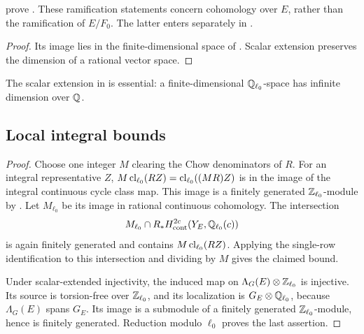  prove
. These ramification statements concern
cohomology over \(E\), rather than the ramification of
\(E/F_0\). The latter enters separately in
.


\begin{proof}
Its image lies in the finite-dimensional space of
. Scalar extension preserves the dimension of
a rational vector space.
\end{proof}

The scalar extension in  is
essential: a finite-dimensional \(\mathbb Q_{\ell_0}\)-space has
infinite dimension over \(\mathbb Q\).

\subsection{Local integral bounds}\label{sec:local-integral}


\begin{proof}
Choose one integer \(M\) clearing the Chow denominators of \(R\).
For an integral representative \(Z\),
\(M\operatorname{cl}_{\ell_0}(RZ)=\operatorname{cl}_{\ell_0}((MR)Z)\) is in the image of
the integral continuous cycle class map. This image is a finitely
generated \(\mathbb Z_{\ell_0}\)-module by
\cite[Theorem~2.4]{Kahn}. Let \(M_{\ell_0}\) be its image in
rational continuous cohomology. The intersection
\[
 M_{\ell_0}\cap R_*H^{2c}_{\mathrm{cont}}(Y_E,\mathbb Q_{\ell_0}(c))
\]
is again finitely generated and contains
\(M\operatorname{cl}_{\ell_0}(RZ)\). Applying the single-row identification
to this intersection and dividing by \(M\) gives the claimed bound.

Under scalar-extended injectivity, the induced map on
\(\Lambda_G(E)\otimes\mathbb Z_{\ell_0}\) is injective. Its source is
torsion-free over \(\mathbb Z_{\ell_0}\), and its localization is
\(G_E\otimes\mathbb Q_{\ell_0}\), because \(\Lambda_G(E)\) spans
\(G_E\). Its image is a submodule of a finitely generated
\(\mathbb Z_{\ell_0}\)-module, hence is finitely generated. Reduction
modulo \(\ell_0\) proves the last assertion.
\end{proof}

